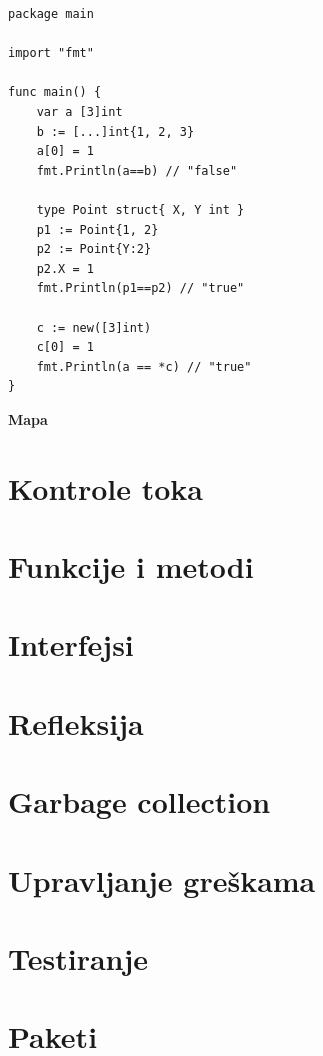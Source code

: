 \documentclass[12pt,oneside]{memoir}
\begin{document}
\begin{center}
\begin{lstlisting}[caption=Primer koji demonstrira rad sa isečcima, label={lst:slice},  backgroundcolor=\color{background}]
package main

import "fmt"

func main() {
	var a [3]int
	b := [...]int{1, 2, 3}
	a[0] = 1
	fmt.Println(a==b) // "false"

	type Point struct{ X, Y int }
	p1 := Point{1, 2}
	p2 := Point{Y:2}
	p2.X = 1
	fmt.Println(p1==p2) // "true"

	c := new([3]int)
	c[0] = 1
	fmt.Println(a == *c) // "true"			
}
\end{lstlisting}
\end{center}

\textbf{Mapa}

\section{Kontrole toka}

\section{Funkcije i metodi} \label{metod}
 
\section{Interfejsi}

\section{Refleksija}

\section{Garbage collection}

\section{Upravljanje greškama}

\section{Testiranje}

\section{Paketi}
\end{document}
